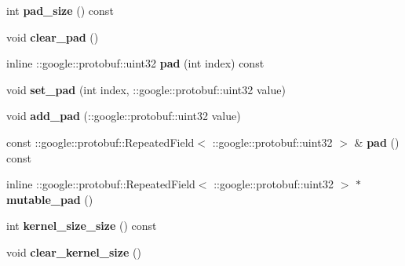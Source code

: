 \begin{DoxyCompactItemize}
int {\bfseries pad\+\_\+size} () const
\item 
\mbox{\label{classcaffe_1_1_convolution_parameter_a5e45e7fb6c3e7e553eab8f12a5053faf}} 
void {\bfseries clear\+\_\+pad} ()
\item 
\mbox{\label{classcaffe_1_1_convolution_parameter_a8cdfaa1157a685bb25ac1771921384f8}} 
inline \+::google\+::protobuf\+::uint32 {\bfseries pad} (int index) const
\item 
\mbox{\label{classcaffe_1_1_convolution_parameter_a2190f5de5bf94a91dafe51ccaa21fc10}} 
void {\bfseries set\+\_\+pad} (int index, \+::google\+::protobuf\+::uint32 value)
\item 
\mbox{\label{classcaffe_1_1_convolution_parameter_a451e196706315fe282848727fc0d4542}} 
void {\bfseries add\+\_\+pad} (\+::google\+::protobuf\+::uint32 value)
\item 
\mbox{\label{classcaffe_1_1_convolution_parameter_a0d108a9cdef4bc4ddaccf3bc58dd9434}} 
const \+::google\+::protobuf\+::\+Repeated\+Field$<$ \+::google\+::protobuf\+::uint32 $>$ \& {\bfseries pad} () const
\item 
\mbox{\label{classcaffe_1_1_convolution_parameter_ae2844747c48b583ba2e53ab00ad6d318}} 
inline \+::google\+::protobuf\+::\+Repeated\+Field$<$ \+::google\+::protobuf\+::uint32 $>$ $\ast$ {\bfseries mutable\+\_\+pad} ()
\item 
\mbox{\label{classcaffe_1_1_convolution_parameter_a5f521b5a78b7cadcd96c6bacedc54e3a}} 
int {\bfseries kernel\+\_\+size\+\_\+size} () const
\item 
\mbox{\label{classcaffe_1_1_convolution_parameter_a3dbcd939f5329365c177a9d8e3a17f31}} 
void {\bfseries clear\+\_\+kernel\+\_\+size} ()
\item 
\mbox{\label{classcaffe_1_1_convolution_parameter_a25e5d884ce87fec7f367536800130d8c}} 

\end{DoxyCompactItemize}

